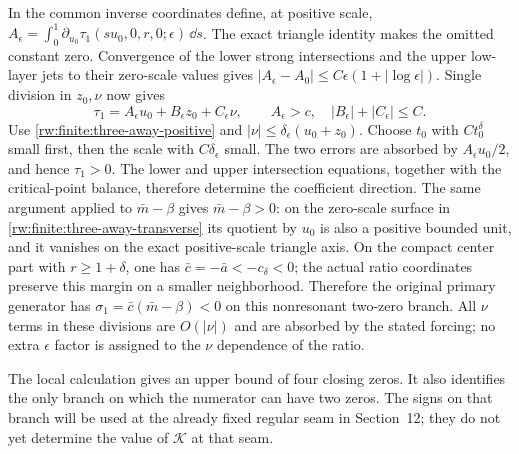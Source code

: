 In the common inverse coordinates define, at positive scale,
$A_\epsilon=\int_0^1\partial_{u_0}
\tau_1(su_0,0,r,0;\epsilon)\,\dd s$.
The exact triangle identity makes the omitted constant zero.
Convergence of the lower strong intersections and the upper
low-layer jets to their zero-scale values gives
$|A_\epsilon-A_0|\le C\epsilon(1+|\log\epsilon|)$.
Single division in $z_0,\nu$ now gives
\[
 \tau_1=A_\epsilon u_0+B_\epsilon z_0+C_\epsilon\nu,\qquad
 A_\epsilon>c,\quad |B_\epsilon|+|C_\epsilon|\le C.
\]
Use \eqref{rw:finite:three-away-positive} and
$|\nu|\le\delta_\epsilon(u_0+z_0)$.
Choose $t_0$ with $C t_0^\delta$ small first, then the scale with
$C\delta_\epsilon$ small. The two errors are absorbed by
$A_\epsilon u_0/2$, and hence $\tau_1>0$. The lower and upper
intersection equations, together with the critical-point balance,
therefore determine the coefficient direction.
The same argument applied to $\bar m-\beta$ gives
$\bar m-\beta>0$: on the zero-scale surface in
\eqref{rw:finite:three-away-transverse} its quotient by $u_0$
is also a positive bounded unit, and it vanishes on the exact
positive-scale triangle axis. On the compact center part with
$r\ge1+\delta$, one has $\bar c=-\bar a<-c_\delta<0$;
the actual ratio coordinates preserve this margin on a smaller
neighborhood. Therefore the original primary generator has
$\sigma_1=\bar c(\bar m-\beta)<0$ on this nonresonant two-zero
branch. All $\nu$ terms in these divisions are $O(|\nu|)$ and
are absorbed by the stated forcing; no extra $\epsilon$ factor
is assigned to the $\nu$ dependence of the ratio.

The local calculation gives an upper bound of four closing zeros. It also identifies the
only branch on which the numerator can have two zeros. The signs on
that branch will be used at the already fixed regular seam in
Section~12; they do not yet determine the value of $\mathcal K$ at
that seam.

